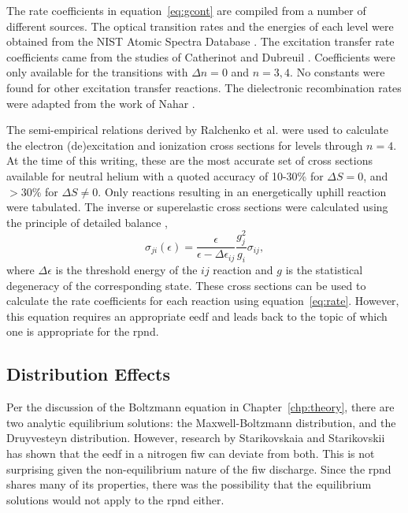 The rate coefficients in equation~\ref{eq:gcont} are compiled from a number of
different sources. The optical transition rates and the energies of each level
were obtained from the NIST Atomic Spectra Database \cite{Kramida2012}. The
excitation transfer rate coefficients came from the studies of Catherinot and
Dubreuil \cite{Catherinot1981, Dubreuil1980}. Coefficients were only available
for the transitions with $\Delta n=0$ and $n=3,4$. No constants were found for
other excitation transfer reactions. The dielectronic recombination rates were
adapted from the work of Nahar \cite{Nahar2010}.

The semi-empirical relations derived by Ralchenko et al. \cite{Ralchenko2008}
were used to calculate the electron (de)excitation and ionization cross sections
for levels through $n=4$. At the time of this writing, these are the most
accurate set of cross sections available for neutral helium with a quoted
accuracy of 10-30\% for $\Delta S=0$, and $>30$\% for $\Delta S \neq 0$. Only
reactions resulting in an energetically uphill reaction were tabulated. The
inverse or superelastic cross sections were calculated using the principle of
detailed balance \cite{Kunze2009},
\begin{equation}
  \sigma_{ji}(\epsilon) = \frac{\epsilon}{\epsilon - \Delta\epsilon_{ij}}
    \frac{g_j^2}{g_i}\sigma_{ij},
\end{equation}
where $\Delta\epsilon$ is the threshold energy of the $ij$ reaction and $g$ is
the statistical degeneracy of the corresponding state. These cross sections can
be used to calculate the rate coefficients for each reaction using
equation~\ref{eq:rate}. However, this equation requires an appropriate
\acs{eedf} and leads back to the topic of which one is appropriate for the
\acs{rpnd}.

\subsection{Distribution Effects}\label{sec:dists}

Per the discussion of the Boltzmann equation in Chapter~\ref{chp:theory}, there
are two analytic equilibrium solutions: the Maxwell-Boltzmann distribution, and
the Druyvesteyn distribution. However, research by Starikovskaia and
Starikovskii \cite{Starikovskaia2001} has shown that the \acs{eedf} in a
nitrogen \acs{fiw} can deviate from both. This is not surprising given the
non-equilibrium nature of the \acs{fiw} discharge. Since the \acs{rpnd} shares
many of its properties, there was the possibility that the equilibrium solutions
would not apply to the \acs{rpnd} either.

